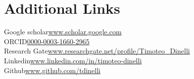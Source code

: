 \section{\sc Additional Links}

    Google scholar\hfill\href{https://scholar.google.com/citations?user=H117wUwAAAAJ&hl=it&oi=ao}{www.scholar.google.com}\\
    ORCID\hfill\href{https://orcid.org/0000-0003-1660-2965}{0000-0003-1660-2965}\\
    Research Gate\hfill\href{https://www.researchgate.net/profile/Timoteo_Dinelli}{www.researchgate.net/profile/Timoteo\_Dinelli}\\
    Linkedin\hfill\href{https://www.linkedin.com/in/timoteo-dinelli/}{www.linkedin.com/in/timoteo-dinelli}\\
    Github\hfill\href{https://github.com/tdinelli}{www.github.com/tdinelli}
